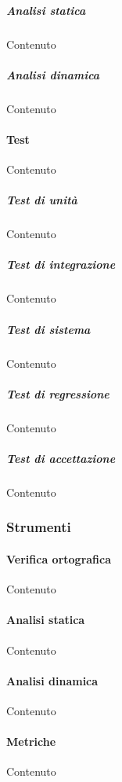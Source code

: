     \subparagraph{Analisi statica}
    Contenuto

    \subparagraph{Analisi dinamica}
    Contenuto


    \paragraph{Test}
    Contenuto

    \subparagraph{Test di unit\`a}
    Contenuto

    \subparagraph{Test di integrazione}
    Contenuto

    \subparagraph{Test di sistema}
    Contenuto

    \subparagraph{Test di regressione}
    Contenuto

    \subparagraph{Test di accettazione}
    Contenuto


    \subsubsection{Strumenti}

    \paragraph{Verifica ortografica}
    Contenuto

    \paragraph{Analisi statica}
    Contenuto

    \paragraph{Analisi dinamica}
    Contenuto

    \paragraph{Metriche}
    Contenuto
